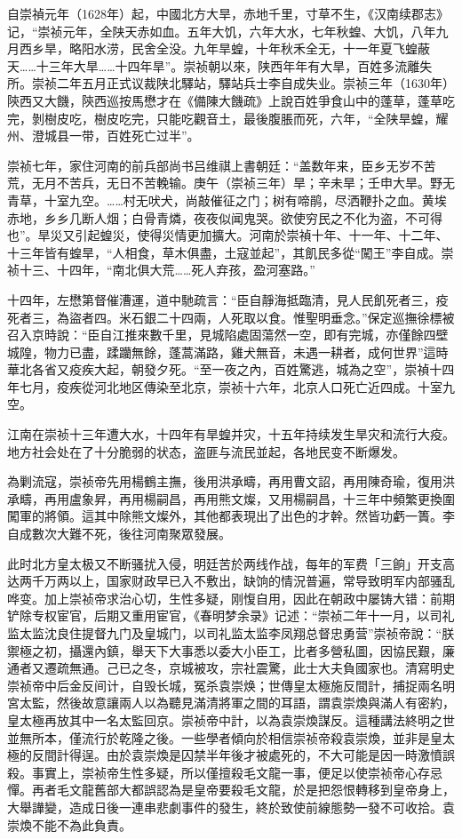 自崇禎元年（1628年）起，中國北方大旱，赤地千里，寸草不生，《汉南续郡志》记，“崇祯元年，全陕天赤如血。五年大饥，六年大水，七年秋蝗、大饥，八年九月西乡旱，略阳水涝，民舍全没。九年旱蝗，十年秋禾全无，十一年夏飞蝗蔽天……十三年大旱……十四年旱”。崇祯朝以來，陕西年年有大旱，百姓多流離失所。崇祯二年五月正式议裁陕北驛站，驛站兵士李自成失业。崇祯三年（1630年）陝西又大饑，陝西巡按馬懋才在《備陳大饑疏》上說百姓爭食山中的蓬草，蓬草吃完，剝樹皮吃，樹皮吃完，只能吃觀音土，最後腹脹而死，六年，“全陕旱蝗，耀州、澄城县一带，百姓死亡过半”。

崇祯七年，家住河南的前兵部尚书吕维祺上書朝廷：“盖数年来，臣乡无岁不苦荒，无月不苦兵，无日不苦輓输。庚午（崇祯三年）旱；辛未旱；壬申大旱。野无青草，十室九空。……村无吠犬，尚敲催征之门；树有啼鹃，尽洒鞭扑之血。黄埃赤地，乡乡几断人烟；白骨青燐，夜夜似闻鬼哭。欲使穷民之不化为盗，不可得也”。旱災又引起蝗災，使得災情更加擴大。河南於崇禎十年、十一年、十二年、十三年皆有蝗旱，“人相食，草木俱盡，土寇並起”，其飢民多從“闖王”李自成。崇祯十三、十四年，“南北俱大荒……死人弃孩，盈河塞路。”

十四年，左懋第督催漕運，道中馳疏言：“臣自靜海抵臨清，見人民飢死者三，疫死者三，為盜者四。米石銀二十四兩，人死取以食。惟聖明垂念。”保定巡撫徐標被召入京時說：“臣自江推來數千里，見城陷處固蕩然一空，即有完城，亦僅餘四壁城隍，物力已盡，蹂躪無餘，蓬蒿滿路，雞犬無音，未遇一耕者，成何世界”這時華北各省又疫疾大起，朝發夕死。“至一夜之內，百姓驚逃，城為之空”，崇禎十四年七月，疫疾從河北地区傳染至北京，崇祯十六年，北京人口死亡近四成。十室九空。

江南在崇祯十三年遭大水，十四年有旱蝗并灾，十五年持续发生旱灾和流行大疫。地方社会处在了十分脆弱的状态，盗匪与流民並起，各地民变不断爆发。

為剿流寇，崇祯帝先用楊鶴主撫，後用洪承疇，再用曹文詔，再用陳奇瑜，復用洪承疇，再用盧象昇，再用楊嗣昌，再用熊文燦，又用楊嗣昌，十三年中頻繁更換圍闖軍的將領。這其中除熊文燦外，其他都表現出了出色的才幹。然皆功虧一簣。李自成數次大難不死，後往河南聚眾發展。

此时北方皇太极又不断骚扰入侵，明廷苦於两线作战，每年的军费「三餉」开支高达两千万两以上，国家财政早已入不敷出，缺饷的情況普遍，常导致明军内部骚乱哗变。加上崇祯帝求治心切，生性多疑，刚愎自用，因此在朝政中屡铸大错：前期铲除专权宦官，后期又重用宦官，《春明梦余录》记述：“崇祯二年十一月，以司礼监太监沈良住提督九门及皇城门，以司礼监太监李凤翔总督忠勇营”崇祯帝說：“朕禦極之初，攝還內鎮，舉天下大事悉以委大小臣工，比者多營私圖，因協民艱，廉通者又遷疏無通。己已之冬，京城被攻，宗社震驚，此士大夫負國家也。清寫明史崇祯帝中后金反间计，自毁长城，冤杀袁崇焕；世傳皇太極施反間計，捕捉兩名明宮太監，然後故意讓兩人以為聽見滿清將軍之間的耳語，謂袁崇煥與滿人有密約，皇太極再放其中一名太監回京。崇祯帝中計，以為袁崇煥謀反。這種講法終明之世並無所本，僅流行於乾隆之後。一些學者傾向於相信崇祯帝殺袁崇煥，並非是皇太極的反間計得逞。由於袁崇煥是囚禁半年後才被處死的，不大可能是因一時激憤誤殺。事實上，崇祯帝生性多疑，所以僅擅殺毛文龍一事，便足以使崇祯帝心存忌憚。再者毛文龍舊部大都誤認為是皇帝要殺毛文龍，於是把怨恨轉移到皇帝身上，大舉譁變，造成日後一連串悲劇事件的發生，終於致使前線態勢一發不可收拾。袁崇煥不能不為此負責。

